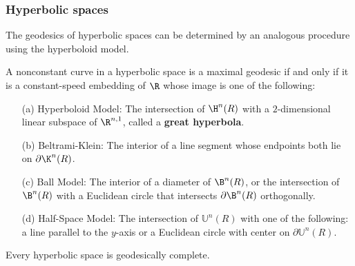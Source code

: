 \subsubsection{Hyperbolic spaces}
The geodesics of hyperbolic spaces can be determined by an analogous procedure
using the hyperboloid model.
\begin{proposition}
A nonconstant curve in a hyperbolic space is a maximal geodesic if and only if it is a constant-speed embedding of $\R$ whose image is one of the following:
\begin{itemize}
\item[(a)] Hyperboloid Model: The intersection of $\H^n(R)$ with a $2$-dimensional linear subspace of $\R^{n,1}$, called a \textbf{great hyperbola}.
\item[(b)] Beltrami-Klein: The interior of a line segment whose endpoints both lie on $\partial\K^n(R)$.
\item[(c)] Ball Model: The interior of a diameter of $\B^n(R)$, or the intersection of $\B^n(R)$ with a Euclidean circle that intersects $\partial\B^n(R)$ orthogonally.
\item[(d)] Half-Space Model: The intersection of $\mathbb{U}^n(R)$ with one of the following: a line parallel to the $y$-axis or a Euclidean circle with center on 
$\partial\mathbb{U}^n(R)$.
\end{itemize}
Every hyperbolic space is geodesically complete.
\end{proposition}
